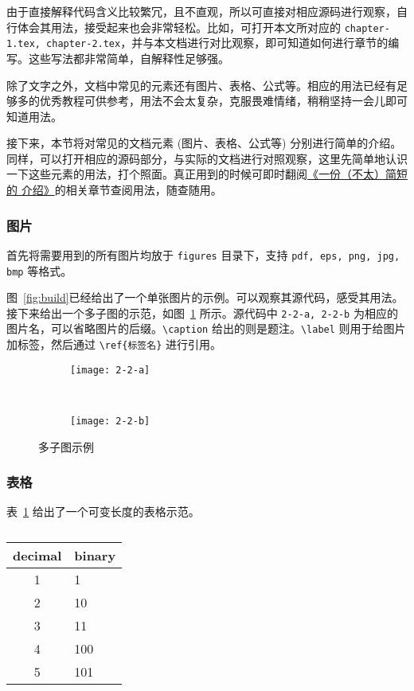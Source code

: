 由于直接解释代码含义比较繁冗，且不直观，所以可直接对相应源码进行观察，自行体会其用法，接受起来也会非常轻松。比如，可打开本文所对应的 \texttt{chapter-1.tex, chapter-2.tex}，并与本文档进行对比观察，即可知道如何进行章节的编写。这些写法都非常简单，自解释性足够强。

除了文字之外，文档中常见的元素还有图片、表格、公式等。相应的用法已经有足够多的优秀教程可供参考，用法不会太复杂，克服畏难情绪，稍稍坚持一会儿即可知道用法。

接下来，本节将对常见的文档元素 (图片、表格、公式等) 分别进行简单的介绍。同样，可以打开相应的源码部分，与实际的文档进行对照观察，这里先简单地认识一下这些元素的用法，打个照面。真正用到的时候可即时翻阅\href{http://mirrors.ctan.org/info/lshort/chinese/lshort-zh-cn.pdf}{《一份（不太）简短的 \LaTeXe 介绍》}的相关章节查阅用法，随查随用。

\subsubsection{图片}

首先将需要用到的所有图片均放于 \texttt{figures} 目录下，支持 \texttt{pdf, eps, png, jpg, bmp} 等格式。

图~\ref{fig:build}已经给出了一个单张图片的示例。可以观察其源代码，感受其用法。接下来给出一个多子图的示范，如图~\ref{fig:subfig} 所示。源代码中 \texttt{2-2-a, 2-2-b} 为相应的图片名，可以省略图片的后缀。\verb|\caption| 给出的则是题注。\verb|\label| 则用于给图片加标签，然后通过 \verb|\ref{标签名}| 进行引用。

\begin{figure}[htb]
    \centering
    \begin{subfigure}[b]{.4\linewidth}
        \centering
        \texttt{[image: 2-2-a]}
        \caption{}
    \end{subfigure}
    ~%
    \begin{subfigure}[b]{.4\linewidth}
        \centering
        \texttt{[image: 2-2-b]}
        \caption{}
    \end{subfigure}
    \caption{\label{fig:subfig} 多子图示例}
\end{figure}

\subsubsection{表格}

表~\ref{table:decimal-to-binary} 给出了一个可变长度的表格示范。

\begin{table}[htb]
    \centering
    \caption{\label{table:decimal-to-binary}}
    \begin{tabularx}{.5\linewidth}{c X<{\centering\arraybackslash}}
        \hline
        decimal & binary \\
        \hline
        1 & 1 \\
        2 & 10 \\
        3 & 11 \\
        4 & 100 \\
        5 & 101 \\
        \hline
    \end{tabularx}
\end{table}

